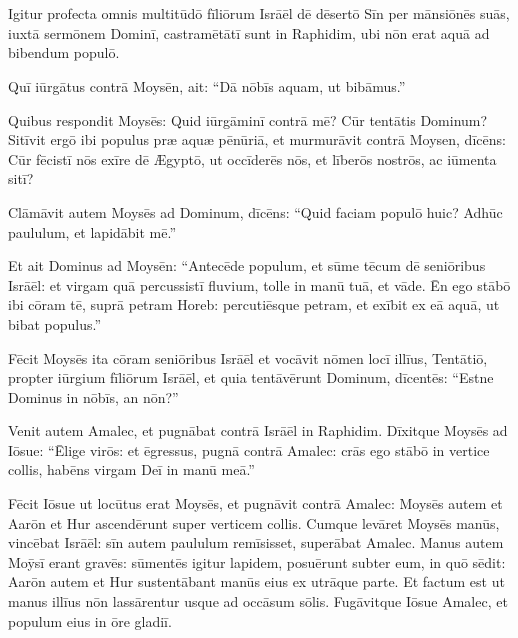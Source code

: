 \chapter{}


\thispagestyle{empty}


Igitur profecta omnis multitūdō fīliōrum Isrāēl dē
dēsertō Sīn per mānsiōnēs suās, iuxtā sermōnem Dominī,
castramētātī sunt in Raphidim, ubi nōn
erat aquā ad bibendum populō. 

Quī iūrgātus contrā
Moysēn, ait: ``Dā nōbīs aquam, ut bibāmus.''

Quibus respondit Moysēs: Quid iūrgāminī contrā mē? Cūr
tentātis Dominum? 
Sitīvit ergō ibi populus præ aquæ pēnūriā, et
murmurāvit contrā Moysen,
dīcēns: Cūr fēcistī nōs exīre dē Ægyptō, ut occīderēs nōs, et līberōs
nostrōs, ac iūmenta sitī? 

Clāmāvit autem Moysēs ad
Dominum, dīcēns: ``Quid faciam populō huic? Adhūc paululum,
et lapidābit mē.''

Et ait Dominus ad Moysēn:
``Antecēde populum, et sūme tēcum dē seniōribus Isrāēl: et
virgam quā percussistī fluvium, tolle in manū tuā, et vāde. 
Ēn ego stābō ibi cōram tē, suprā petram
Horeb: percutiēsque petram, et exībit ex eā aquā, ut bibat
populus.''

Fēcit Moysēs ita cōram seniōribus Isrāēl 
et vocāvit nōmen locī
illīus, Tentātiō, propter iūrgium fīliōrum
Isrāēl, et quia tentāvērunt Dominum, dīcentēs: ``Estne Dominus in nōbīs, an
nōn?''

Venit autem Amalec, et pugnābat contrā Isrāēl in Raphidim.
Dīxitque Moysēs ad Iōsue: ``Ēlige virōs: et ēgressus, pugnā contrā Amalec:
crās ego stābō in vertice collis, habēns virgam Deī in manū
meā.''

Fēcit Iōsue ut locūtus erat Moysēs, et pugnāvit contrā Amalec:
Moysēs autem et Aarōn et Hur ascendērunt super verticem
collis. 
Cumque levāret Moysēs manūs, vincēbat Isrāēl: sīn autem
paululum remīsisset, superābat Amalec. 
Manus autem Moȳsī
erant gravēs: sūmentēs igitur lapidem, posuērunt
subter eum, in quō sēdit: Aarōn autem et Hur
sustentābant manūs eius ex utrāque parte. Et factum est ut
manus illīus nōn lassārentur usque ad occāsum sōlis. 
Fugāvitque Iōsue Amalec, et populum eius in ōre gladiī. 

